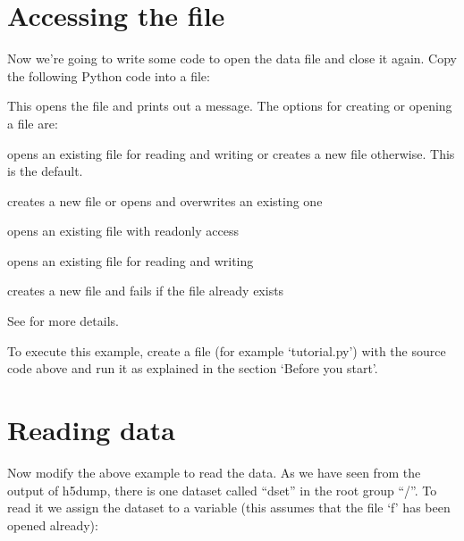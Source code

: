 \documentclass[letterpaper,10pt,english]{sphinxmanual}
\begin{document}
\section{Accessing the file}
\label{\detokenize{index:accessing-the-file}}
\sphinxAtStartPar
Now we’re going to write some code to open the data file and close it again.
Copy the following Python code into a file:

\begin{sphinxVerbatim}[commandchars=\\\{\}]
 

  
\end{sphinxVerbatim}

\sphinxAtStartPar
This opens the file  and prints out a message. The options for creating or opening a file are:
\begin{description}
\sphinxAtStartPar
opens an existing file for reading and writing or creates a new file otherwise. This is the default.

\sphinxAtStartPar
creates a new file or opens and overwrites an existing one

\sphinxAtStartPar
opens an existing file with read\sphinxhyphen{}only access

\sphinxAtStartPar
opens an existing file for reading and writing

\sphinxAtStartPar
creates a new file and fails if the file already exists

\end{description}

\sphinxAtStartPar
See  for more details.

\sphinxAtStartPar
To execute this example, create a file (for example ‘tutorial.py’) with the source code above and run it as explained in the section ‘Before you start’.


\section{Reading data}
\label{\detokenize{index:reading-data}}
\sphinxAtStartPar
Now modify the above example to read the data. As we have seen from the output of h5dump, there is one dataset called “dset” in the root group “/”. To read it we assign the dataset to a variable (this assumes that the file ‘f’ has been opened already):
\end{document}
